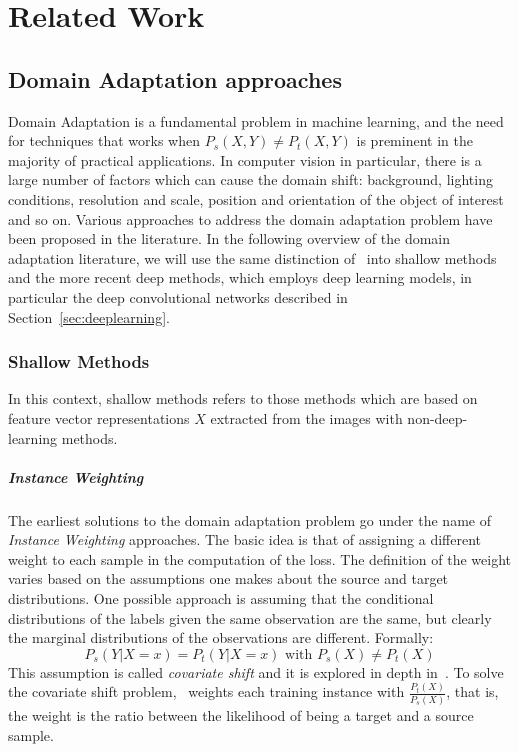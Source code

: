 \documentclass[../main.tex]{subfiles}
\begin{document}
    \chapter{Related Work}\label{chap:related}

    \section{Domain Adaptation approaches}\label{sec:related-word}
	Domain Adaptation is a fundamental problem in machine learning, and the need for techniques that works when
	$P_{s}(X, Y) \neq P_{t}(X, Y)$ is preminent in the majority of practical applications. In computer vision in particular,
	there is a large number of factors which can cause the domain shift: background, lighting conditions, resolution and scale,
	position and orientation of the object of interest and so on. Various approaches to address the domain adaptation problem
	have been proposed in the literature. In the following overview of the domain adaptation literature, we will use the same
	distinction of~\cite{DBLP:journals/corr/Csurka17} into shallow methods and the more recent deep methods, which employs
	deep learning models, in particular the deep convolutional networks described in Section~\ref{sec:deeplearning}.

    \subsection{Shallow Methods}
	In this context, shallow methods refers to those methods which are based on feature vector representations $X$ extracted from
	the images with non-deep-learning methods.

	\paragraph{Instance Weighting}
	The earliest solutions to the domain adaptation problem go under the name
	of \textit{Instance Weighting} approaches.
	The basic idea is that of assigning a different weight to each sample in the computation of the loss. The definition of the
	weight varies based on the assumptions one makes about the source and target distributions. One possible approach is assuming
	that the conditional distributions of the labels given the same observation are the same, but clearly the marginal distributions
	of the observations are different. Formally:
	$$ P_{s}(Y | X = x) = P_{t}(Y | X = x) \text{ with } P_{s}(X) \neq P_{t}(X) $$
	This assumption is called \textit{covariate shift} and it is explored in depth in~\cite{shimoidara2000}. To solve the covariate
	shift problem,~\cite{shimoidara2000} weights each training instance with $\frac{P_{t}(X)}{P_{s}(X)}$, that is, the weight is the
	ratio between the likelihood of being a target and a source sample.
\end{document}
